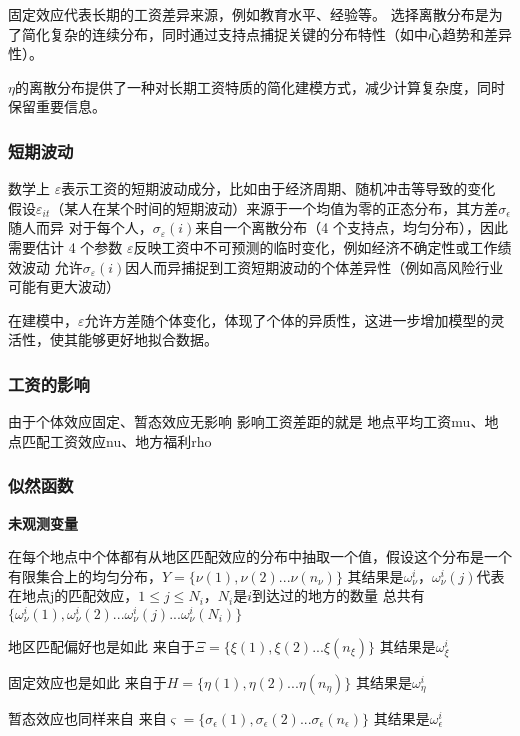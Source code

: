\documentclass[a4paper,12pt,oneside]{book} %
\begin{document}
固定效应代表长期的工资差异来源，例如教育水平、经验等。
选择离散分布是为了简化复杂的连续分布，同时通过支持点捕捉关键的分布特性（如中心趋势和差异性）。

$\eta$的离散分布提供了一种对长期工资特质的简化建模方式，减少计算复杂度，同时保留重要信息。

\subsubsection{短期波动}

数学上
$\varepsilon$表示工资的短期波动成分，比如由于经济周期、随机冲击等导致的变化
假设$\varepsilon_{it}$（某人在某个时间的短期波动）来源于一个均值为零的正态分布，其方差$\sigma_{\epsilon}$随人而异
对于每个人，$\sigma_\varepsilon(i)$来自一个离散分布（4 个支持点，均匀分布），因此需要估计 4 个参数
$\varepsilon$反映工资中不可预测的临时变化，例如经济不确定性或工作绩效波动
允许$\sigma_\varepsilon(i)$因人而异捕捉到工资短期波动的个体差异性（例如高风险行业可能有更大波动）


在建模中，$\varepsilon$允许方差随个体变化，体现了个体的异质性，这进一步增加模型的灵活性，使其能够更好地拟合数据。

\subsubsection{工资的影响}

由于个体效应固定、暂态效应无影响
影响工资差距的就是
地点平均工资mu、地点匹配工资效应nu、地方福利rho

\subsubsection{似然函数}

\textbf{未观测变量}

在每个地点中个体都有从地区匹配效应的分布中抽取一个值，假设这个分布是一个有限集合上的均匀分布，$Y=\{\nu(1),\nu(2)...\nu(n_{\nu})\}$
其结果是$\omega^{i}_{\nu}$，$\omega^{i}_{\nu}(j)$代表在地点j的匹配效应，$1\leqslant j\leqslant N_i$，$N_i$是$i$到达过的地方的数量
总共有$\{\omega^{i}_{\nu}(1),\omega^{i}_{\nu}(2)...\omega^{i}_{\nu}(j)...\omega^{i}_{\nu}(N_i)\}$

地区匹配偏好也是如此
来自于$\Xi=\{\xi(1),\xi(2)...\xi(n_{\xi})\}$
其结果是$\omega^{i}_{\xi}$

固定效应也是如此
来自于$H=\{\eta(1),\eta(2)...\eta(n_\eta)\}$
其结果是$\omega^{i}_{\eta}$

暂态效应也同样来自
来自$\varsigma=\{\sigma_{\epsilon}(1),\sigma_{\epsilon}(2)...\sigma_{\epsilon}(n_{\epsilon})\}$
其结果是$\omega^{i}_{\epsilon}$
\end{document}
